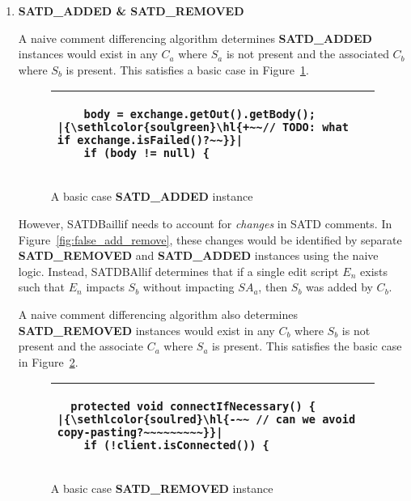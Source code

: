 \documentclass[3p]{elsarticle}
\DeclareRobustCommand{\hlremove}[1]{{\sethlcolor{soulred}\hl{#1}}}
\DeclareRobustCommand{\hladd}[1]{{\sethlcolor{soulgreen}\hl{#1}}}
\begin{document}
\begin{enumerate}
    \item \textbf{SATD\_ADDED \& SATD\_REMOVED}


A naive comment differencing algorithm determines \textbf{SATD\_ADDED} instances would exist in any $C_a$ where $S_a$ is not present and the associated $C_b$ where $S_b$ is present. This satisfies a basic case in Figure~\ref{fig:added_1}. 

\begin{figure}
    \centering
    \begin{tabular}{|p{25.2em}|}
    \hline
        \begin{lstlisting}
    body = exchange.getOut().getBody();
|\hladd{+~~// TODO: what if exchange.isFailed()?~~}|
    if (body != null) {
        \end{lstlisting}
    \\\hline
    \end{tabular}
    \caption{A basic case \textbf{SATD\_ADDED} instance}
    \label{fig:added_1}
\end{figure}

However, SATDBaillif needs to account for \textit{changes} in SATD comments. In Figure~\ref{fig:false_add_remove}, these changes would be identified by separate \textbf{SATD\_REMOVED} and \textbf{SATD\_ADDED} instances using the naive logic. Instead, SATDBAllif determines that if a single edit script $E_n$ exists such that $E_n$ impacts $S_b$ without impacting $SA_a$, then $S_b$ was added by $C_b$.

A naive comment differencing algorithm also determines \textbf{SATD\_REMOVED} instances would exist in any $C_b$ where $S_b$ is not present and the associate $C_a$ where $S_a$ is present. This satisfies the basic case in Figure~\ref{fig:removed_1}.

\begin{figure}
    \centering
    \begin{tabular}{|p{25.2em}|}
    \hline
        \begin{lstlisting}
  protected void connectIfNecessary() {
|\hlremove{-~~ // can we avoid copy-pasting?~~~~~~~~~}|
    if (!client.isConnected()) {
        \end{lstlisting}
    \\\hline
    \end{tabular}
    \caption{A basic case \textbf{SATD\_REMOVED} instance}
    \label{fig:removed_1}
\end{figure}


\end{enumerate}
\end{document}
